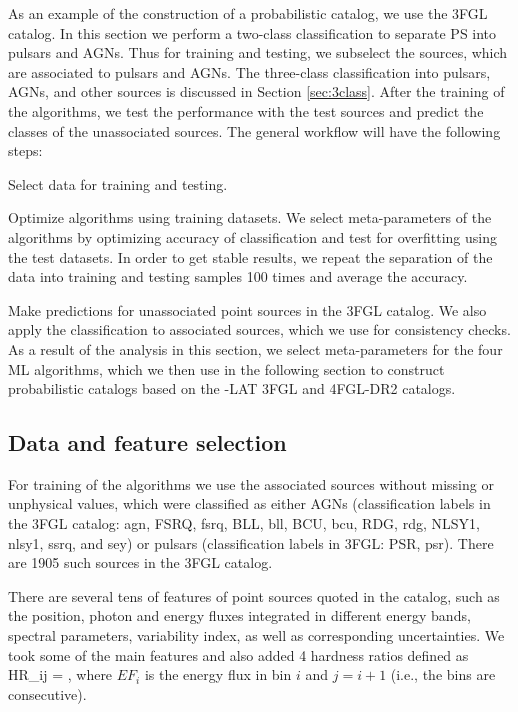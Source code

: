 As an example of the construction of a probabilistic catalog, we use the 3FGL catalog.
In this section we perform a two-class classification to separate PS into pulsars and AGNs.
Thus for training and testing, we subselect the sources, which are associated to pulsars and AGNs.
The three-class classification into pulsars, AGNs, and other sources is discussed in Section \ref{sec:3class}.
After the training of the algorithms, we test the performance with the test sources and predict the classes of the unassociated sources.
The general workflow will have the following steps:
\ben
\item
Select data for training and testing.
\item
Optimize algorithms using training datasets.
We select meta-parameters of the algorithms by optimizing accuracy of classification and test for overfitting using the test datasets.
In order to get stable results, we repeat the separation of the data into training and testing samples 100 times and 
average the accuracy.
\item
Make predictions for unassociated point sources in the 3FGL catalog.
We also apply the classification to associated sources, which we use for consistency checks.
\een
As a result of the analysis in this section, we select meta-parameters for the four ML algorithms,
which we then use in the following section to construct probabilistic catalogs
based on the \Fermi-LAT 3FGL and 4FGL-DR2 catalogs.



\subsection{Data and feature selection}

For training of the algorithms we use the associated sources without missing or unphysical values, 
which were classified as either AGNs (classification labels in the 3FGL catalog: agn, FSRQ, fsrq, BLL, bll, BCU, bcu, RDG, rdg, NLSY1, nlsy1, ssrq, and sey) or pulsars (classification labels in 3FGL: PSR, psr). 
There are 1905 such sources in the 3FGL catalog. 

There are several tens of features of point sources quoted in the catalog, such as the position, photon and energy fluxes integrated in different energy bands, spectral parameters, variability index, as well as corresponding uncertainties. 
We took some of the main features and also added 4 hardness ratios defined as 
\bea
{}
HR_{ij} = ,
\eea
where $EF_i$ is the energy flux in bin $i$ and $j = i + 1$ (i.e., the bins are consecutive).

